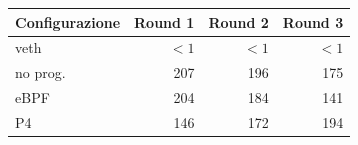 \begin{tabular}{@{}lrrr@{}}
        \toprule
        \textbf{Configurazione} & \textbf{Round 1} & \textbf{Round 2} & \textbf{Round 3} \\
        \midrule
        veth & $<1$ & $<1$ & $<1$ \\
        no prog. & 207 & 196 & 175 \\
        eBPF & 204 & 184 & 141 \\
        P4 & 146 & 172 & 194 \\
        \bottomrule
    \end{tabular}